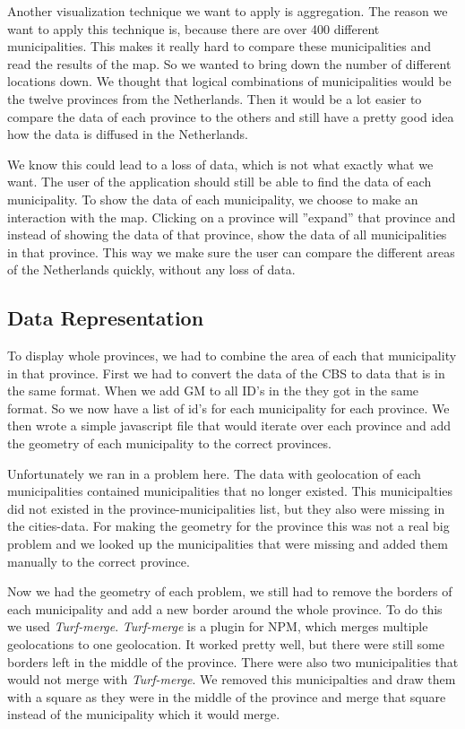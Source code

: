 		Another visualization technique we want to apply is aggregation.
		The reason we want to apply this technique is, because there are over 400 different municipalities.
		This makes it really hard to compare these municipalities and read the results of the map.
		So we wanted to bring down the number of different locations down.
		We thought that logical combinations of municipalities would be the twelve provinces from the Netherlands.
		Then it would be a lot easier to compare the data of each province to the others and still have a pretty good idea how the data is diffused in the Netherlands.

		We know this could lead to a loss of data, which is not what exactly what we want.
		The user of the application should still be able to find the data of each municipality.
		To show the data of each municipality, we choose to make an interaction with the map.
		Clicking on a province will ''expand'' that province and instead of showing the data of that province, show the data of all municipalities in that province.
		This way we make sure the user can compare the different areas of the Netherlands quickly, without any loss of data.

	\subsection{Data Representation}
		To display whole provinces, we had to combine the area of each that municipality in that province.
		First we had to convert the data of the CBS to data that is in the same format.
		When we add GM to all ID's in the they got in the same format.
		So we now have a list of id's for each municipality for each province.
		We then wrote a simple javascript file that would iterate over each province and add the geometry of each municipality to the correct provinces.

		Unfortunately we ran in a problem here.
		The data with geolocation of each municipalities contained municipalities that no longer existed.
		This municipalties did not existed in the province-municipalities list, but they also were missing in the cities-data.
		For making the geometry for the province this was not a real big problem and we looked up the municipalities that were missing and added them manually to the correct province.

		Now we had the geometry of each problem, we still had to remove the borders of each municipality and add a new border around the whole province.
		To do this we used \emph{Turf-merge}.
		\emph{Turf-merge} is a plugin for NPM, which merges multiple geolocations to one geolocation.
		It worked pretty well, but there were still some borders left in the middle of the province.
		There were also two municipalities that would not merge with \emph{Turf-merge}.
		We removed this municipalties and draw them with a square as they were in the middle of the province and merge that square instead of the municipality which it would merge.

